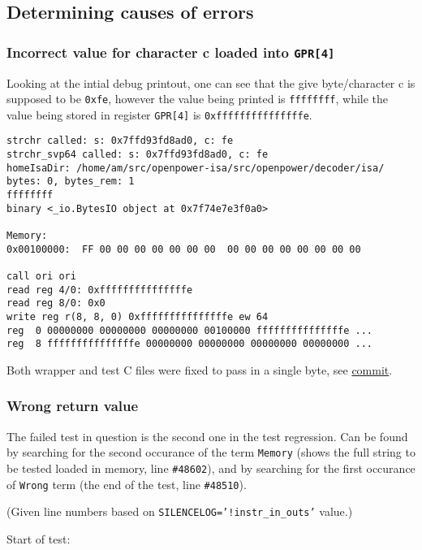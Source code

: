 \subsection{Determining causes of errors}
\label{subsec:determine_cause_err}

\subsubsection{Incorrect value for character \textbf{c} loaded into \texttt{GPR[4]}}

Looking at the intial debug printout, one can see that the give byte/character
c is supposed to be \texttt{0xfe}, however the value being printed
is \texttt{ffffffff}, while the value being stored in register \texttt{GPR[4]}
is \texttt{0xfffffffffffffffe}.

\begin{verbatim}
strchr called: s: 0x7ffd93fd8ad0, c: fe
strchr_svp64 called: s: 0x7ffd93fd8ad0, c: fe
homeIsaDir: /home/am/src/openpower-isa/src/openpower/decoder/isa/
bytes: 0, bytes_rem: 1
ffffffff
binary <_io.BytesIO object at 0x7f74e7e3f0a0>

Memory:
0x00100000:  FF 00 00 00 00 00 00 00  00 00 00 00 00 00 00 00

call ori ori
read reg 4/0: 0xfffffffffffffffe
read reg 8/0: 0x0
write reg r(8, 8, 0) 0xfffffffffffffffe ew 64
reg  0 00000000 00000000 00000000 00100000 fffffffffffffffe ...
reg  8 fffffffffffffffe 00000000 00000000 00000000 00000000 ...
\end{verbatim}

Both wrapper and test C files were fixed to pass in a single byte, see
\href{https://git.vantosh.com/ngisearch/glibc-svp64/commit/8f1b25340ee2f108027a6f50e365d42aeb7cc939}{commit}.

\subsubsection{Wrong return value}

The failed test in question is the second one in the test regression. Can be
found by searching for the second occurance of the term \texttt{Memory}
(shows the full string to be tested loaded in memory, line \texttt{\#48602}),
and by searching for the first occurance of \texttt{Wrong} term
(the end of the test, line \texttt{\#48510}).

(Given line numbers based on \texttt{SILENCELOG='!instr\_in\_outs'} value.)

Start of test:

